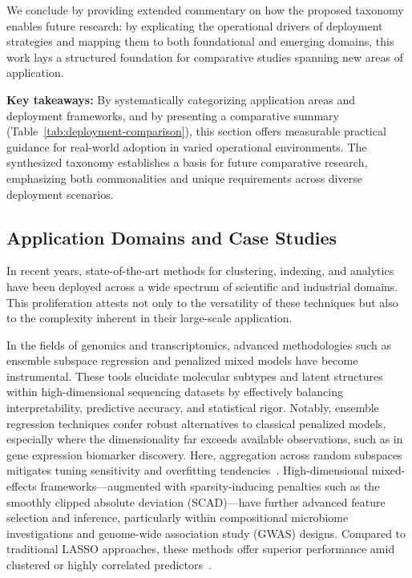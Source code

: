 \documentclass[sigconf]{acmart}
\begin{document}
We conclude by providing extended commentary on how the proposed taxonomy enables future research: by explicating the operational drivers of deployment strategies and mapping them to both foundational and emerging domains, this work lays a structured foundation for comparative studies spanning new areas of application.

\textbf{Key takeaways:} By systematically categorizing application areas and deployment frameworks, and by presenting a comparative summary (Table~\ref{tab:deployment-comparison}), this section offers measurable practical guidance for real-world adoption in varied operational environments. The synthesized taxonomy establishes a basis for future comparative research, emphasizing both commonalities and unique requirements across diverse deployment scenarios.

\subsection{Application Domains and Case Studies}

In recent years, state-of-the-art methods for clustering, indexing, and analytics have been deployed across a wide spectrum of scientific and industrial domains. This proliferation attests not only to the versatility of these techniques but also to the complexity inherent in their large-scale application. 

In the fields of genomics and transcriptomics, advanced methodologies such as ensemble subspace regression and penalized mixed models have become instrumental. These tools elucidate molecular subtypes and latent structures within high-dimensional sequencing datasets by effectively balancing interpretability, predictive accuracy, and statistical rigor. Notably, ensemble regression techniques confer robust alternatives to classical penalized models, especially where the dimensionality far exceeds available observations, such as in gene expression biomarker discovery. Here, aggregation across random subspaces mitigates tuning sensitivity and overfitting tendencies~\cite{ref79,ref100}. High-dimensional mixed-effects frameworks—augmented with sparsity-inducing penalties such as the smoothly clipped absolute deviation (SCAD)—have further advanced feature selection and inference, particularly within compositional microbiome investigations and genome-wide association study (GWAS) designs. Compared to traditional LASSO approaches, these methods offer superior performance amid clustered or highly correlated predictors~\cite{ref82}.
\end{document}
